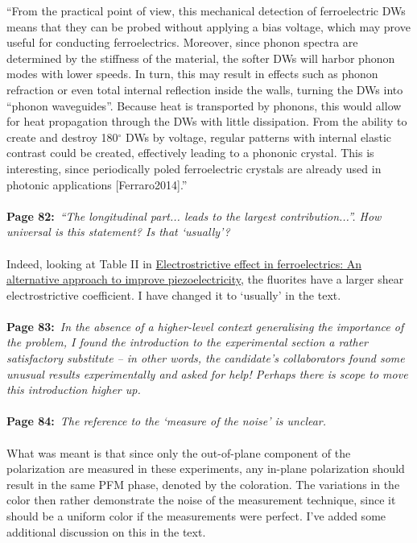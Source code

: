 \documentclass[a4, UTF8]{article}
\begin{document}
``From the practical point of view, this mechanical detection of ferroelectric DWs means that they can be probed without applying a bias voltage, which may prove useful for conducting ferroelectrics. Moreover, since phonon spectra are determined by the stiffness of the material, the softer DWs will harbor phonon modes with lower speeds. In turn, this may result in effects such as phonon refraction or even total internal reflection inside the walls, turning the DWs into ``phonon waveguides''. Because heat is transported by phonons, this would allow for heat propagation through the DWs with little dissipation. From the ability to create and destroy 180$^\circ$ DWs by voltage, regular patterns with internal elastic contrast could be created, effectively leading to a phononic crystal.
This is interesting, since periodically poled ferroelectric crystals are already used in photonic applications [Ferraro2014].''
\\\\
{\bf Page 82:}~{\it ``The longitudinal part... leads to the largest contribution...''. How universal is this statement? Is that `usually'?}
\\\\
Indeed, looking at Table II in \href{http://dx.doi.org/10.1063/1.4861260}{Electrostrictive effect in ferroelectrics: An alternative approach to improve piezoelectricity}, the fluorites have a larger shear electrostrictive coefficient. I have changed it to `usually' in the text.
\\\\
{\bf Page 83:}~{\it In the absence of a higher-level context generalising the importance of the problem, I found the introduction to the experimental section a rather satisfactory substitute – in other words, the candidate’s collaborators found some unusual results experimentally and asked for help!
Perhaps there is scope to move this introduction higher up.}
\\\\
{\bf Page 84:}~{\it The reference to the `measure of the noise’ is unclear.}
\\\\
What was meant is that since only the out-of-plane component of the polarization are measured in these experiments, any in-plane polarization should result in the same PFM phase, denoted by the coloration. The variations in the color then rather demonstrate the noise of the measurement technique, since it should be a uniform color if the measurements were perfect. I've added some additional discussion on this in the text.
\end{document}
